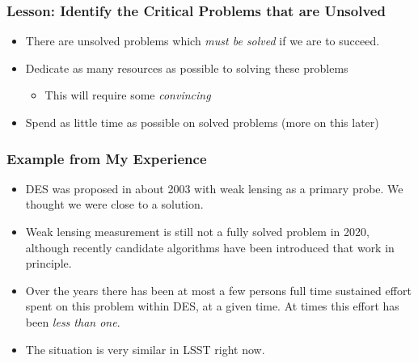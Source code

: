 \documentclass{beamer}
\begin{document}
\frame
{
    \frametitle{Lesson: Identify the Critical Problems that are Unsolved}

    \begin{itemize}

        \item There are unsolved problems which {\em must be solved} if we are to succeed.

        \item Dedicate as many resources as possible to solving these problems

            \begin{itemize}
                \item This will require some {\em convincing}
            \end{itemize}

        \item Spend as little time as possible on solved problems (more on this later)

    \end{itemize}

}

\frame
{
    \frametitle{Example from My Experience}


    \begin{itemize}

        \item DES was proposed in about 2003 with weak lensing as a primary
            probe.  We thought we were close to a solution.

        \item Weak lensing measurement is still not a fully solved problem in
            2020, although recently candidate algorithms have been introduced
            that work in principle.


        \item  Over the years there has been at most a few persons full time
            sustained effort spent on this problem within DES, at a given time.
            At times this effort has been {\em less than one}.

        \item The situation is very similar in LSST right now.

    \end{itemize}

}
\end{document}
